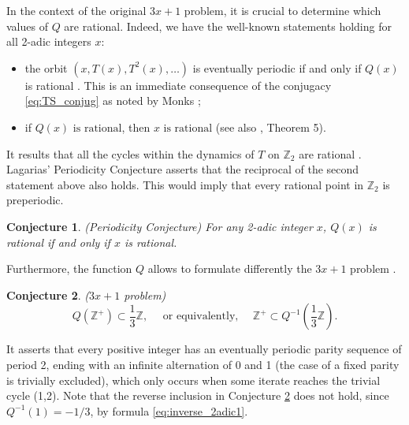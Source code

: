 \documentclass[12pt]{article}
\newtheorem{conjecture}{Conjecture}
\theoremstyle{definition}
\begin{document}
In the context of the original $3x+1$ problem, it is crucial to determine which values of $Q$ are rational. Indeed, we have the well-known statements holding for all 2-adic integers $x$:
\begin{itemize}
\item the orbit $\left(  x, T(x), T^{2}(x), \ldots \right) $ is eventually periodic if and only if $Q(x)$ is rational \cite{Aki04}. This is an immediate consequence of the conjugacy \eqref{eq:TS_conjug} as noted by Monks \cite{Mon04};
\item if $ Q(x) \text{ is rational}$, then $ x \text{ is rational}$  \cite{Ber94} (see also \cite{Aki04}, Theorem 5).
\end{itemize}
It results that all the cycles within the dynamics of $T$ on $\mathbb Z_2$ are rational \cite{Lag90}. Lagarias' Periodicity Conjecture \cite{Lag85} asserts that the reciprocal of the second statement above also holds. This would imply that every rational point in $\mathbb Z_2$ is preperiodic.

\begin{conjecture} {\em (Periodicity Conjecture)} \label{conj:periodicity}
For any 2-adic integer $x$, $Q(x)$ is rational if and only if $x$ is rational.
\end{conjecture}

 Furthermore, the function $Q$ allows to formulate differently the $3x+1$ problem \cite{Ber94,Lag85}.
\begin{conjecture} {\em ($3x+1$ problem)} \label{conj:Q_3x+1}
$$ Q\left( \mathbb Z^{+}\right) \subset \frac{1}{3} \mathbb Z , \quad \text{ or equivalently, } \quad \mathbb Z^{+} \subset Q^{-1}\left( \frac{1}{3} \mathbb Z \right).$$
\end{conjecture}
It asserts that every positive integer has an eventually periodic parity sequence of period 2, ending with an infinite alternation of 0 and 1 (the case of a fixed parity is trivially excluded), which only occurs when some iterate reaches the trivial cycle (1,2). Note that the reverse inclusion in Conjecture \ref{conj:Q_3x+1} does not hold, since $Q^{-1}(1)=-1/3$, by formula \eqref{eq:inverse_2adic1}.
\end{document}
